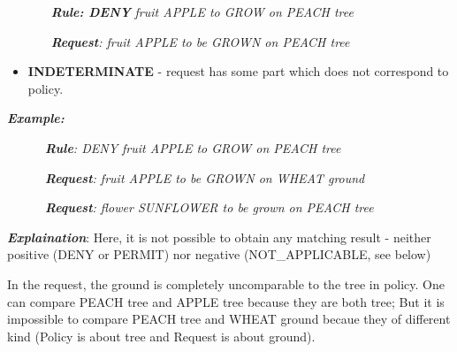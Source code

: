 \documentclass[a4paper]{article}
\newcommand\liststyleWWviiiNumxxi{%
\renewcommand\labelitemi{[F0B7?]}
\renewcommand\labelitemii{o}
\renewcommand\labelitemiii{[F0A7?]}
\renewcommand\labelitemiv{[F0B7?]}
}
\begin{document}
{\upshape\color{black}
\foreignlanguage{english}{\textbf{\textit{\ \ \ \ \ \ Rule: DENY
}}}\foreignlanguage{english}{\textit{fruit APPLE to GROW on PEACH
tree}}}

{\upshape\color{black}
\foreignlanguage{english}{\textbf{\textit{\ \ \ \ \ \ Request}}}\foreignlanguage{english}{\textit{:
fruit APPLE to be GROWN on PEACH tree}}}

\liststyleWWviiiNumxxi
\begin{itemize}
\item {\color{black}
\foreignlanguage{english}{\textbf{INDETERMINATE}}\foreignlanguage{english}{
- request has some part which does not correspond to policy.}}
\end{itemize}
{\bfseries\itshape\color{black}
Example: }

{\upshape\color{black}
\foreignlanguage{english}{\textit{\ \ \ \ \ \ }}\foreignlanguage{english}{\textbf{\textit{Rule}}}\foreignlanguage{english}{\textit{:
DENY fruit APPLE to GROW on PEACH tree}}}

{\upshape\color{black}
\foreignlanguage{english}{\textit{\ \ \ \ \ \ }}\foreignlanguage{english}{\textbf{\textit{Request}}}\foreignlanguage{english}{\textit{:
fruit APPLE to be GROWN on WHEAT ground}}}

{\upshape\color{black}
\foreignlanguage{english}{\textit{\ \ \ \ \ \ }}\foreignlanguage{english}{\textbf{\textit{Request}}}\foreignlanguage{english}{\textit{:
flower SUNFLOWER to be grown on PEACH tree}}}

{\upshape\color{black}
\foreignlanguage{english}{\textbf{\textit{Explaination}}}\foreignlanguage{english}{:
Here, it is not possible to obtain any matching result - neither
positive (DENY or PERMIT) nor negative (NOT\_APPLICABLE, see below)}}

{\color{black}
In the request, the {\textquotedbl}ground{\textquotedbl} is completely
uncomparable to the {\textquotedbl}tree{\textquotedbl} in policy. One
can compare {\textquotedbl}PEACH tree{\textquotedbl} and
{\textquotedbl}APPLE tree{\textquotedbl} because they are both
{\textquotedbl}tree{\textquotedbl}; But it is impossible to compare
{\textquotedbl}PEACH tree{\textquotedbl} and {\textquotedbl}WHEAT
ground{\textquotedbl} becaue they of different kind (Policy is about
tree and Request is about ground).}
\end{document}

